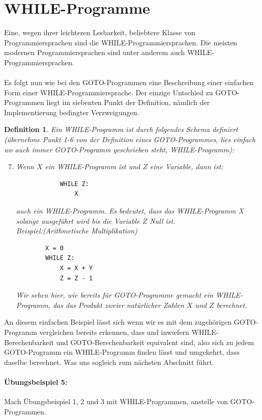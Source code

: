 \documentclass[11pt,a4paper,leqno]{report}
\newtheorem{definition}[theorem]{Definition}
\numberwithin{equation}{chapter}
\begin{document}
\section{WHILE-Programme}
Eine, wegen ihrer leichteren Lesbarkeit, beliebtere Klasse von Programmiersprachen sind die WHILE-Programmiersprachen. Die meisten modernen Programmiersprachen sind unter anderem auch WHILE-Programmiersprachen.\\
\\
Es folgt nun wie bei den GOTO-Programmen eine Beschreibung einer einfachen Form einer WHILE-Programmiersprache. Der einzige Untschied zu GOTO-Programmen liegt im siebenten Punkt der Definition, n\"amlich der Implementierung bedingter Verzweigungen.
\begin{definition}
	Ein WHILE-Programm ist durch folgendes Schema definiert (\"ubernehme Punkt 1-6 von der Definition eines GOTO-Programmes, lies einfach wo auch immer GOTO-Programm geschrieben steht, WHILE-Programm):
	\begin{enumerate}
 		\setcounter{enumi}{6}
		\item Wenn $X$ ein WHILE-Programm ist und $Z$ eine Variable, dann ist: 
		\begin{lstlisting}
			WHILE Z:
			    X
		\end{lstlisting}
		auch ein WHILE-Programm. Es bedeutet, dass das WHILE-Programm X solange ausgef\"uhrt wird bis die Variable $Z$ Null ist.\\
		Beispiel:(Arithmetische Multiplikation)
		\begin{lstlisting}
		X = 0
		WHILE Z:
		    X = X + Y
		    Z = Z - 1
		\end{lstlisting}	
		Wir sehen hier, wie bereits f\"ur GOTO-Programme gemacht ein WHILE-Programm, das das Produkt zweier nat\"urlicher Zahlen $X$ und $Z$ berechnet. 
	\end{enumerate}
\end{definition}
An diesem einfachen Beispiel l\"asst sich wenn wir es mit dem zugeh\"origen GOTO-Programm vergleichen bereits erkennen, dass und inwiefern WHILE-Berechenbarkeit und GOTO-Berechenbarkeit equivalent sind, also sich zu jedem GOTO-Programm ein WHILE-Programm finden l\"asst und umgekehrt, dass daselbe berechnet. Was uns sogleich zum n\"achsten Abschnitt f\"uhrt.
\paragraph{\"Ubungsbeispiel 5:} Mach \"Ubungsbeispiel 1, 2 und 3 mit WHILE-Programmen, anstelle von GOTO-Programmen.
\end{document}
